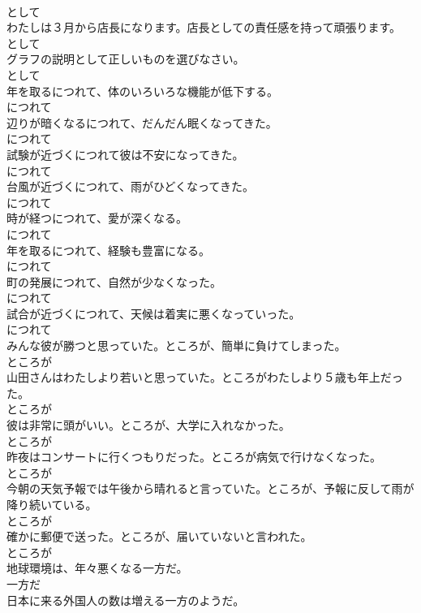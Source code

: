 \documentclass[8pt]{extreport}
\begin{document}
\begin{CJK}{UTF8}{min}
\\	として
\\	わたしは３月から店長になります。店長としての責任感を持って頑張ります。	
\\	として
\\	グラフの説明として正しいものを選びなさい。	
\\	として
\\	年を取るにつれて、体のいろいろな機能が低下する。	
\\	につれて
\\	辺りが暗くなるにつれて、だんだん眠くなってきた。	
\\	につれて
\\	試験が近づくにつれて彼は不安になってきた。	
\\	につれて
\\	台風が近づくにつれて、雨がひどくなってきた。	
\\	につれて
\\	時が経つにつれて、愛が深くなる。	
\\	につれて
\\	年を取るにつれて、経験も豊富になる。	
\\	につれて
\\	町の発展につれて、自然が少なくなった。	
\\	につれて
\\	試合が近づくにつれて、天候は着実に悪くなっていった。	
\\	につれて
\\	みんな彼が勝つと思っていた。ところが、簡単に負けてしまった。	
\\	ところが
\\	山田さんはわたしより若いと思っていた。ところがわたしより５歳も年上だった。	
\\	ところが
\\	彼は非常に頭がいい。ところが、大学に入れなかった。	
\\	ところが
\\	昨夜はコンサートに行くつもりだった。ところが病気で行けなくなった。	
\\	ところが
\\	今朝の天気予報では午後から晴れると言っていた。ところが、予報に反して雨が降り続いている。	
\\	ところが
\\	確かに郵便で送った。ところが、届いていないと言われた。	
\\	ところが
\\	地球環境は、年々悪くなる一方だ。	
\\	一方だ
\\	日本に来る外国人の数は増える一方のようだ。	

\end{CJK}
\end{document}
